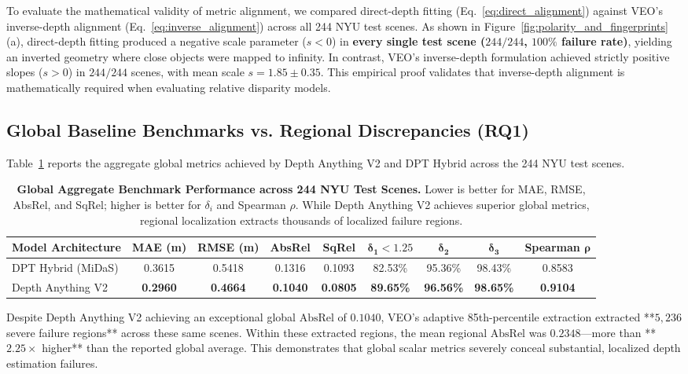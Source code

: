 \documentclass[11pt,a4paper]{article}
\begin{document}
To evaluate the mathematical validity of metric alignment, we compared direct-depth fitting (Eq.~\ref{eq:direct_alignment}) against VEO's inverse-depth alignment (Eq.~\ref{eq:inverse_alignment}) across all 244 NYU test scenes. As shown in Figure~\ref{fig:polarity_and_fingerprints}(a), direct-depth fitting produced a negative scale parameter ($s < 0$) in \textbf{every single test scene ($244/244$, $100\%$ failure rate)}, yielding an inverted geometry where close objects were mapped to infinity. In contrast, VEO's inverse-depth formulation achieved strictly positive slopes ($s > 0$) in $244/244$ scenes, with mean scale $s = 1.85 \pm 0.35$. This empirical proof validates that inverse-depth alignment is mathematically required when evaluating relative disparity models.

\subsection{Global Baseline Benchmarks vs. Regional Discrepancies (RQ1)}
Table~\ref{tab:global_benchmarks} reports the aggregate global metrics achieved by Depth Anything V2 and DPT Hybrid across the 244 NYU test scenes.

\begin{table}[h]
\caption{\textbf{Global Aggregate Benchmark Performance across 244 NYU Test Scenes.} Lower is better for MAE, RMSE, AbsRel, and SqRel; higher is better for $\delta_i$ and Spearman $\rho$. While Depth Anything V2 achieves superior global metrics, regional localization extracts thousands of localized failure regions.}
\label{tab:global_benchmarks}
\centering
\small
\begin{tabular}{@{}lcccccccc@{}}
\toprule
\textbf{Model Architecture} & \textbf{MAE (m)} & \textbf{RMSE (m)} & \textbf{AbsRel} & \textbf{SqRel} & $\bm{\delta_1 < 1.25}$ & $\bm{\delta_2}$ & $\bm{\delta_3}$ & \textbf{Spearman} $\bm{\rho}$ \\
\midrule
DPT Hybrid (MiDaS) & 0.3615 & 0.5418 & 0.1316 & 0.1093 & 82.53\% & 95.36\% & 98.43\% & 0.8583 \\
Depth Anything V2 & \textbf{0.2960} & \textbf{0.4664} & \textbf{0.1040} & \textbf{0.0805} & \textbf{89.65\%} & \textbf{96.56\%} & \textbf{98.65\%} & \textbf{0.9104} \\
\bottomrule
\end{tabular}
\end{table}

Despite Depth Anything V2 achieving an exceptional global $\text{AbsRel}$ of $0.1040$, VEO's adaptive 85th-percentile extraction extracted **$5,236$ severe failure regions** across these same scenes. Within these extracted regions, the mean regional $\text{AbsRel}$ was $0.2348$—more than **$2.25\times$ higher** than the reported global average. This demonstrates that global scalar metrics severely conceal substantial, localized depth estimation failures.
\end{document}
